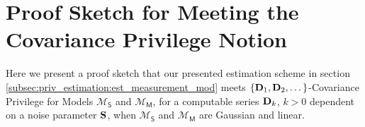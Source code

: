 % 
%                                                                                                         
%                                                                                                         
%                                                                                                         
% 

\chapter{Proof Sketch for Meeting the Covariance Privilege Notion}\label{app:priv_est_proof_sketch}
Here we present a proof sketch that our presented estimation scheme in section \ref{subsec:priv_estimation:est_measurement_mod} meets $\{{{\mathbf{D}}}_1,{{\mathbf{D}}}_2,\dots\}$-Covariance Privilege for Models $\mathcal{M}_{\mathsf{S}}$ and $\mathcal{M}_{\mathsf{M}}$, for a computable series ${{\mathbf{D}}}_k$, $k>0$ dependent on a noise parameter ${{\mathbf{S}}}$, when $\mathcal{M}_{\mathsf{S}}$ and $\mathcal{M}_{\mathsf{M}}$ are Gaussian and linear.


